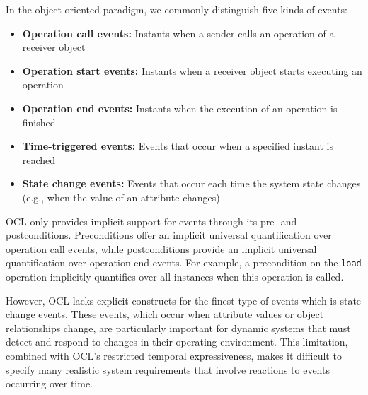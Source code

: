 In the object-oriented paradigm, we commonly distinguish five kinds of events: 
\begin{itemize} 
    \item \textbf{Operation call events:} Instants when a sender calls an operation of a receiver object 
    \item \textbf{Operation start events:} Instants when a receiver object starts executing an operation 
    \item \textbf{Operation end events:} Instants when the execution of an operation is finished 
    \item \textbf{Time-triggered events:} Events that occur when a specified instant is reached 
    \item \textbf{State change events:} Events that occur each time the system state changes (e.g., when the value of an attribute changes) 
\end{itemize}

OCL only provides implicit support for events through its pre- and postconditions. 
Preconditions offer an implicit universal quantification over operation call events, 
while postconditions provide an implicit universal quantification over operation end 
events. For example, a precondition on the \texttt{load} operation implicitly 
quantifies over all instances when this operation is called.

However, OCL lacks explicit constructs for the finest type of events which is state change 
events. These events, which occur when attribute values or object relationships 
change, are particularly important for dynamic systems that must detect and 
respond to changes in their operating environment. This limitation, combined with OCL's restricted temporal 
expressiveness, makes it difficult to specify many realistic system requirements 
that involve reactions to events occurring over time.
